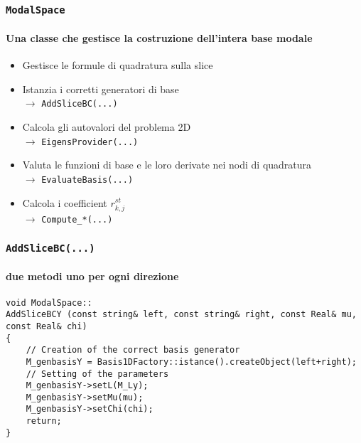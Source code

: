 \begin{frame}
 \frametitle{\texttt{ModalSpace}}
 \framesubtitle{Una classe che gestisce la costruzione dell'intera base modale}
 \begin{itemize}
  \item Gestisce le formule di quadratura sulla slice
  \item Istanzia i corretti generatori di base\\
  $\rightarrow$ \texttt{AddSliceBC(...)}
  \item Calcola gli autovalori del problema 2D\\
  $\rightarrow$ \texttt{EigensProvider(...)}
  \item Valuta le funzioni di base e le loro derivate nei nodi di quadratura\\
  $\rightarrow$ \texttt{EvaluateBasis(...)}
  \item Calcola i coefficient $r^{st}_{k,j}$\\
  $\rightarrow$ \texttt{Compute\_*(...)}
 \end{itemize}
\end{frame}
\begin{frame}[fragile]
\frametitle{\texttt{AddSliceBC(...)}}
\framesubtitle{due metodi uno per ogni direzione}
\begin{lstlisting}[style = general]
void ModalSpace::
AddSliceBCY (const string& left, const string& right, const Real& mu, const Real& chi)
{
	// Creation of the correct basis generator
	M_genbasisY = Basis1DFactory::istance().createObject(left+right);
	// Setting of the parameters
	M_genbasisY->setL(M_Ly);
	M_genbasisY->setMu(mu);
	M_genbasisY->setChi(chi);
	return;
}
\end{lstlisting}
\end{frame}



